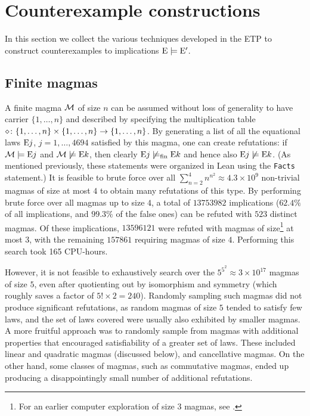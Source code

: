 
\section{Counterexample constructions}\label{constructions-sec}

In this section we collect the various techniques developed in the ETP to construct counterexamples to implications $\mathrm{E} \models {\mathrm{E}'}$.

\subsection{Finite magmas}\label{finite-sec}

A finite magma ${\mathcal{M}}$ of size $n$ can be assumed without loss of generality to have carrier $\{1,\dots,n\}$ and described by specifying the multiplication table $\diamond \colon \{1,\dots,n\} \times \{1,\dots,n\} \to \{1,\dots,n\}$.  By generating a list of all the equational laws $\mathrm{E}j$, $j=1,\dots,4694$ satisfied by this magma, one can create refutations: if ${\mathcal{M}} \models \mathrm{E}j$ and ${\mathcal{M}} \not \models \mathrm{E}k$, then clearly $\mathrm{E}j \not\models_{\mathrm{fin}} \mathrm{E}k$ and hence also $\mathrm{E}j \not\models \mathrm{E}k$.  (As mentioned previously, these statements were organized in Lean using the \texttt{Facts} statement.) It is feasible to brute force over all $\sum_{n=2}^4 n^{n^2} \approx 4.3 \times 10^9$ non-trivial magmas of size at most $4$ to obtain many refutations of this type.
By performing brute force over all magmas up to size $4$, a total of $\num{13753982}$ implications ($62.4\%$ of all implications, and $99.3\%$ of the false ones) can be refuted with $523$ distinct magmas. Of these implications, $\num{13596121}$ were refuted with magmas of size\footnote{For an earlier computer exploration of size $3$ magmas, see \cite{berman-burris}.} at most $3$, with the remaining $\num{157861}$ requiring magmas of size $4$. Performing this search took 165 CPU-hours.

However, it is not feasible to exhaustively search over the $5^{5^2} \approx 3 \times 10^{17}$ magmas of size $5$, even after quotienting out by isomorphism and symmetry (which roughly saves a factor of $5! \times 2 = 240$).  Randomly sampling such magmas did not produce significant refutations, as random magmas of size $5$ tended to satisfy few laws, and the set of laws covered were usually also exhibited by smaller magmas.  A more fruitful approach was to randomly sample from magmas with additional properties that encouraged satisfiability of a greater set of laws.  These included linear and quadratic magmas (discussed below), and cancellative magmas.  On the other hand, some classes of magmas, such as commutative magmas, ended up producing a disappointingly small number of additional refutations.

